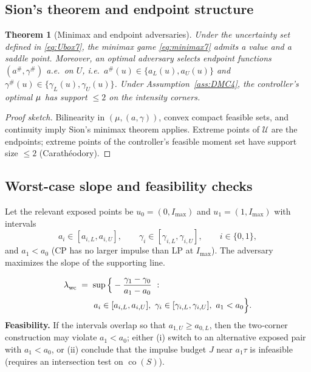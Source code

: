 \documentclass[aps,pre,twocolumn,showpacs,superscriptaddress]{revtex4-2}
\newtheorem{theorem}{Theorem}
\theoremstyle{definition}
\begin{document}
\subsection{Sion’s theorem and endpoint structure}\label{subsec:sion7}

\begin{theorem}[Minimax and endpoint adversaries]\label{thm:minimax7}
Under the uncertainty set defined in \eqref{eq:Ubox7}, the minimax game \eqref{eq:minimax7} admits a value and a saddle point. Moreover, an optimal adversary selects \emph{endpoint} functions $(a^\#, \gamma^\#)$ a.e.\ on $U$, i.e.\ $a^\#(u)\in\{a_L(u),a_U(u)\}$ and $\gamma^\#(u)\in\{\gamma_L(u),\gamma_U(u)\}$. Under Assumption~\ref{ass:DMC4}, the controller's optimal $\mu^{\*}$ has support $\le 2$ on the intensity corners.
\end{theorem}

\begin{proof}[Proof sketch]
Bilinearity in $(\mu,(a,\gamma))$, convex compact feasible sets, and continuity imply Sion’s minimax theorem applies. Extreme points of $\mathcal{U}$ are the endpoints; extreme points of the controller’s feasible moment set have support size $\le 2$ (Carath\'eodory).
\end{proof}

\subsection{Worst-case slope and feasibility checks}\label{subsec:wcSlope7}

Let the relevant exposed points be $u_0=(0,I_{\max})$ and $u_1=(1,I_{\max})$ with intervals
\[
a_i\in[a_{i,L},a_{i,U}],\qquad \gamma_i\in[\gamma_{i,L},\gamma_{i,U}],\qquad i\in\{0,1\},
\]
and $a_1<a_0$ (CP has no larger impulse than LP at $I_{\max}$). The adversary maximizes the slope of the supporting line.

\begin{align}\label{eq:wc-slope}
\lambda^{\*}_{\rm wc} &\;=\; \sup\Big\{-\frac{\gamma_1-\gamma_0}{a_1-a_0}\ :\nonumber\\
&\qquad a_i\in[a_{i,L},a_{i,U}],\ \gamma_i\in[\gamma_{i,L},\gamma_{i,U}],\ a_1<a_0\Big\}.
\end{align}
\textbf{Feasibility.} If the intervals overlap so that $a_{1,U}\ge a_{0,L}$, then the two‑corner construction may violate $a_1<a_0$; either (i) switch to an alternative exposed pair with $a_1<a_0$, or (ii) conclude that the impulse budget $J$ near $a_1\tau$ is infeasible (requires an intersection test on $\operatorname{co}(S)$).
\end{document}
